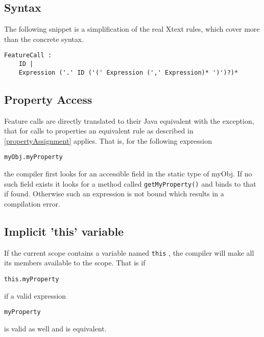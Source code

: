 \documentclass[a4paper,10pt]{scrreprt}
\begin{document}
\subsection{Syntax}

The following snippet is a simplification of the real Xtext rules, which cover more than the concrete syntax.
\begin{lstlisting}
FeatureCall :
	ID |
	Expression ('.' ID ('(' Expression (',' Expression)* ')')?)*

\end{lstlisting}





\subsection{Property Access}
\label{PropertyAccess}
Feature calls are directly translated to their Java equivalent with the exception, that for calls to properties an equivalent rule as described in 
\autoref{propertyAssignment} applies. 
That is, for the following expression

\begin{lstlisting}
myObj.myProperty

\end{lstlisting}


the compiler first looks for an accessible field in the static type of myObj. If no such field exists it looks for a method called \lstinline{getMyProperty()}
 and binds to that if found.
Otherwise such an expression is not bound which results in a compilation error.




\subsection{Implicit 'this' variable}
\label{ImplicitThis}
If the current scope contains a variable named \lstinline{this}
, the compiler will make all its members available to the scope. 
That is if 
\begin{lstlisting}
this.myProperty

\end{lstlisting}

if a valid expression
\begin{lstlisting}
myProperty

\end{lstlisting}

is valid as well and is equivalent. 
\end{document}
